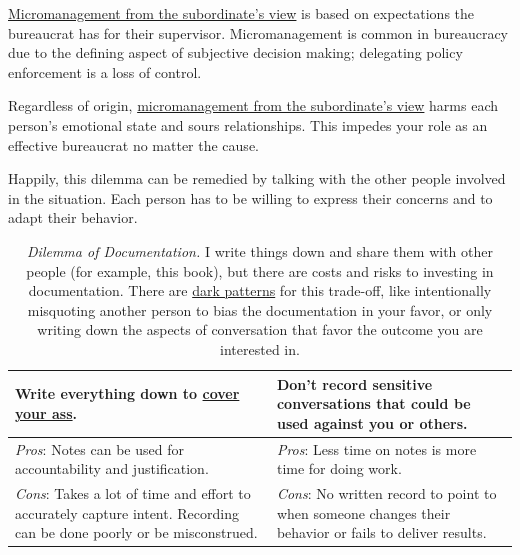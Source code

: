 \href{table:solution-provider}{Micromanagement from the subordinate's view} is based on expectations the bureaucrat has for their supervisor. Micromanagement is common in bureaucracy due to the defining aspect of subjective decision making; delegating policy enforcement is a loss of control. 

Regardless of origin, \href{table:solution-provider}{micromanagement from the subordinate's view} harms each person's emotional state and sours relationships. This impedes your role as an effective bureaucrat no matter the cause.

Happily, this dilemma can be remedied by talking with the other people involved in the situation. Each person has to be willing to express their concerns and to adapt their behavior. 

\begin{center}
\begin{table}[H] %
\begin{tabular}{ | m{\dilemmatablewidth}| m{\dilemmatablewidth} | } 
  \hline
  \textbf{Write everything down to \href{https://en.wikipedia.org/wiki/Cover_your_ass}{cover your ass}.
  \index{Wikipedia!\href{https://en.wikipedia.org/wiki/Cover_your_ass}{cover your ass}}
  } &
  \textbf{Don't record sensitive conversations that could be used against you or others.} \\
  \hline
  \textit{Pros}: Notes can be used for accountability and justification. &
  \textit{Pros}: Less time on notes is more time for doing work. \\
  \hline
  \textit{Cons}: Takes a lot of time and effort to accurately capture intent. Recording can be done poorly or be misconstrued.  & 
  \textit{Cons}: No written record to point to when someone changes their behavior or fails to deliver results. \\
  \hline
\end{tabular}
\caption{\textit{Dilemma of Documentation.}
I write things down and share them with other people (for example, this book), but there are costs and risks to investing in documentation. There are \href{https://en.wikipedia.org/wiki/Dark_pattern}{dark patterns}
for this trade-off, like intentionally misquoting another person to bias the documentation in your favor, or only writing down the aspects of conversation that favor the outcome you are interested in.  
}
\label{table:notes-or-no-notes}
\end{table}
\end{center}

